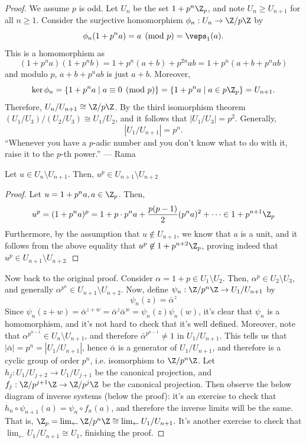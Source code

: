 \begin{proof}
    We assume $p$ is odd. Let $U_n$ be the set $1+p^n\Z_p$, and note $U_n \geq U_{n+1}$ for all $n\geq 1$. Consider the surjective homomorphism $\phi_n:U_n \to \Z/p\Z$ by
    $$\phi_n(1+p^na)= a \pmod p = \veps_1(a).$$
    This is a homomorphism as
    $$(1+p^na)(1+p^nb)=1+p^n(a+b)+p^{2n}ab=1+p^n(a+b+p^nab)$$
    and modulo $p$, $a+b+p^nab$ is just $a+b$. Moreover,
    $$\ker \phi_n= \{ 1 +p^na \mid a \equiv 0 \pmod p\} = \{1+p^na\mid a \in p\Z_p\} = U_{n+1}.$$
    Therefore, $U_n/U_{n+1} \cong \Z/p\Z$. By the third isomorphism theorem $(U_1/U_3)/(U_2/U_3) \cong U_1/U_2$, and it follows that $|U_1/U_3|=p^2$. Generally,
    $$|U_1/U_{n+1}| = p^n.$$
    ``Whenever you have a $p$-adic number and you don't know what to do with it, raise it to the $p$-th power.'' --- Rama
    \begin{lem}
        Let $u \in U_n \setminus U_{n+1}$. Then, $u^p \in U_{n+1}\setminus U_{n+2}$
    \end{lem}
    \begin{proof}
        Let $u = 1+p^na,a \in \Z_p$. Then,
        $$u^p=(1+p^na)^p=1+p\cdot p^{n}a+\frac{p(p-1)}{2}(p^na)^2+\cdots \in 1+p^{n+1}\Z_p$$
        Furthermore, by the assumption that $u \not \in U_{n+1}$, we know that $a$ is a unit, and it follows from the above equality that $u^p \not \in 1+p^{n+2}\Z_p$, proving indeed that $u^p \in U_{n+1}\setminus U_{n+2.}$
    \end{proof}

    Now back to the original proof. Consider $\alpha = 1 + p \in U_1\setminus U_2$. Then, $\alpha^p \in U_2 \setminus U_3$, and generally $\alpha^{p^n}\in U_{n+1}\setminus U_{n+2}$. Now, define $\psi_n:\Z/p^n\Z \to U_1/U_{n+1}$ by
    $$\psi_n(z)=\bar \alpha^z$$
    Since $\psi_n(z+w)=\bar \alpha^{z+w}=\bar \alpha^z\bar \alpha^w=\psi_n(z)\psi_n(w)$, it's clear that $\psi_n$ is a homomorphism, and it's not hard to check that it's well defined. Moreover, note that $\alpha^{p^{n-1}}\in U_n \setminus U_{n+1}$, and therefore $\bar \alpha^{p^{n-1}} \neq 1$ in $U_1/U_{n+1}$. This tells us that $|\bar \alpha|=p^n=|U_1/U_{n+1}|$, hence $\bar \alpha$ is a generator of $U_1/U_{n+1}$, and therefore is a cyclic group of order $p^n$, i.e. isomorphism to $\Z/p^n\Z$. Let $h_j:U_1/U_{j+2}\to U_1/U_{j+1}$ be the canonical projection, and $f_j:\Z/p^{j+1}\Z \to \Z/p^j\Z$ be the canonical projection. Then observe the below diagram of inverse systems (below the proof): it's an exercise to check that $h_n \circ \psi_{n+1}(a) = \psi_n\circ f_n(a)$, and therefore the inverse limits will be the same. That is, $\Z_p =\lim_{\leftarrow}\Z/p^n\Z \cong \lim_{\leftarrow}U_1/U_{n+1}$. It's another exercise to check that $\lim_{\leftarrow}U_1 /U_{n+1} \cong U_1$, finishing the proof.
\end{proof}

